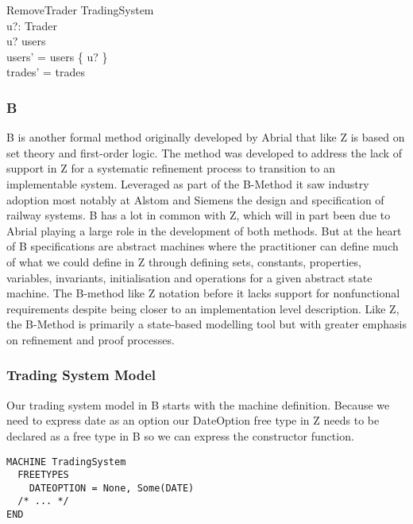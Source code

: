 \documentclass{article}
\begin{document}
\begin{schema}{RemoveTrader}
\Delta TradingSystem \\
u?: Trader \\ 
\where
u? \in users \\
users' = users \setminus \{ u? \} \\
trades' = trades \\
\end{schema}

\subsubsection*{B}

B is another formal method originally developed by Abrial that like Z is based on set theory and first-order logic. The method was developed to address the lack of support in Z for a systematic refinement process to transition to an implementable system. Leveraged as part of the B-Method it saw industry adoption most notably at Alstom and Siemens the design and specification of railway systems.  
\newline \newline
B has a lot in common with Z, which will in part been due to Abrial playing a large role in the development of both methods. But at the heart of B specifications are abstract machines where the practitioner can define much of what we could define in Z through defining sets, constants, properties, variables, invariants, initialisation and operations for a given abstract state machine.
\newline \newline
The B-method like Z notation before it lacks support for nonfunctional requirements despite being closer to an implementation level description. Like Z, the B-Method is primarily a state-based modelling tool but with greater emphasis on refinement and proof processes. 
\subsubsection*{Trading System Model}

Our trading system model in B starts with the machine definition. Because we need to express date as an option our DateOption free type in Z needs to be declared as a free type in B so we can express the constructor function.
\begin{verbatim}
MACHINE TradingSystem
  FREETYPES
    DATEOPTION = None, Some(DATE)
  /* ... */
END
\end{verbatim}
\end{document}
